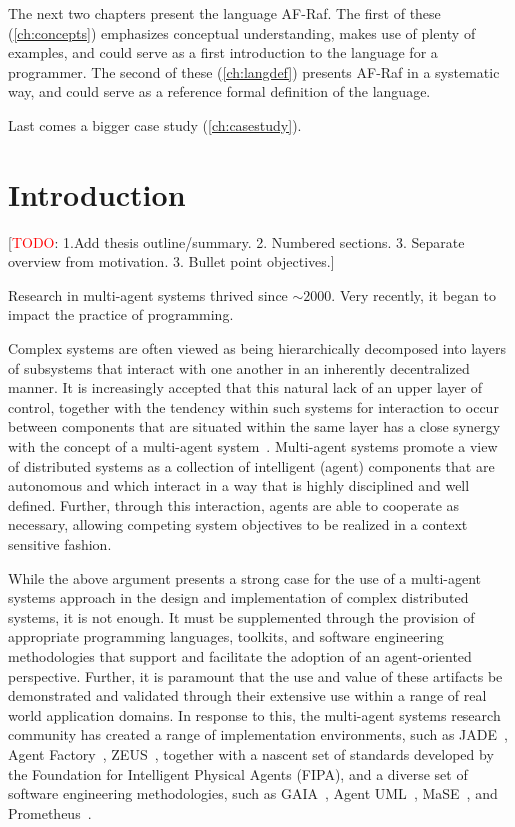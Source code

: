 \documentclass[a4paper,12pt,oneside,fleqn]{book} %
\newcommand{\rg}[1]{\marginpar{\tiny\raggedright\textcolor{blue}{\bf rg:} #1}}
\newcommand{\todo}[1]{[\textcolor{red}{TODO}: #1]}
\renewcommand{\rg}{}
\begin{document}
The next two chapters present the language AF-Raf. The first of these
(\autoref{ch:concepts}) emphasizes conceptual understanding, makes use of
plenty of examples, and could serve as a first introduction to the language
for a programmer. The second of these (\autoref{ch:langdef}) presents
AF-Raf in a systematic way, and could serve as a reference formal
definition of the language.

Last comes a bigger case study (\autoref{ch:casestudy}).

\mainmatter
\chapter{Introduction}\label{ch:intro} %

\todo{1.Add thesis outline/summary. 2. Numbered sections. 3. Separate
overview from motivation. 3. Bullet point objectives.}

Research in multi-agent systems thrived since $\sim2000$.
Very recently, it began to impact the practice of programming.

Complex systems are often viewed as being hierarchically decomposed into layers
of subsystems that interact with one another in an inherently decentralized
manner. It is increasingly accepted that this natural lack of an upper layer of
control, together with the tendency within such systems for interaction to
occur between components that are situated within the same layer has a close
synergy with the concept of a multi-agent
system~\cite{Jennings00agent-orientedsoftware}. Multi-agent systems promote a
view of distributed systems as a collection of intelligent (agent) components
that are autonomous and which interact in a way that is highly disciplined and
well defined. Further, through this interaction, agents are able to cooperate
as necessary, allowing competing system objectives to be realized in a context
sensitive fashion.

While the above argument presents a strong case for the use of a multi-agent
systems approach in the design and implementation of complex distributed
systems, it is not enough. It must be supplemented through the provision of
appropriate programming languages, toolkits, and software engineering
methodologies that support and facilitate the adoption of an agent-oriented
perspective. Further, it is paramount that the use and value of these artifacts
be demonstrated and validated through their extensive use within a range of
real world application domains. In response to this, the multi-agent systems
research community has created a range of implementation environments, such as
JADE~\cite{DBLP:books/sp/map2005/BellifemineBCP05}, Agent
Factory~\cite{collier1999agent}, ZEUS~\cite{DBLP:conf/agents/NwanaNLC99},
together with a nascent set of standards developed by the Foundation for
Intelligent Physical Agents (FIPA), and a diverse set of software engineering
methodologies, such as GAIA~\cite{DBLP:journals/aamas/WooldridgeJK00}, Agent
UML~\cite{bauer2001agent}, MaSE~\cite{deloach2001analysis}, and
Prometheus~\cite{DBLP:conf/atal/PadghamW02}.
\end{document}
